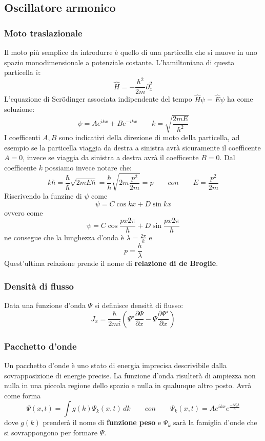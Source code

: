 \subsection{Oscillatore armonico}
\subsubsection{Moto traslazionale}
Il moto più semplice da introdurre è quello di una particella che si muove in uno spazio monodimensionale a potenziale costante. L'hamiltoniana di questa particella è:
$$\hat{H} = - \frac{\hbar^2}{2m} \partial_x^2$$
L'equazione di Scr\"odinger associata indipendente del tempo $\hat{H}\psi = \hat{E}\psi$ ha come soluzione:
$$\psi = A e^{i k x} + B e^{- i k x} \qquad k = \sqrt{\frac{2 m E}{\hbar^2}}$$
I coefficenti $A, B$ sono indicativi della direzione di moto della particella, ad esempio se la particella viaggia da destra a sinistra avrà sicuramente il coefficente $A = 0$, invece se viaggia da sinistra a destra avrà il coefficente $B = 0$.
Dal coefficente $k$ possiamo invece notare che:
$$k\hbar = \frac{\hbar}{\hbar} \sqrt{2 m E \hbar} = \frac{\hbar}{\hbar} \sqrt{2 m \frac{p^2}{2 m}} = p \qquad con \qquad E = \frac{p^2}{2m}$$
Riscrivendo la funzine di $\psi$ come
$$\psi = C \cos{kx} + D \sin{kx}$$
ovvero come
$$\psi = C \cos{\frac{p x 2 \pi}{h}} + D \sin{\frac{p x 2 \pi}{h}}$$
ne consegue che la lunghezza d'onda è $\lambda = \frac{2\pi}{k}$ e
$$p = \frac{h}{\lambda}$$
Quest'ultima relazione prende il nome di \textbf{relazione di de Broglie}.

\subsubsection{Densità di flusso}
Data una funzione d'onda $\Psi$ si definisce densità di flusso:
$$J_x = \frac{\hbar}{2mi}\left(\Psi^{\star} \frac{\partial \Psi}{\partial x} - \Psi \frac{\partial \Psi^{\star}}{\partial x}  \right)$$

\subsubsection{Pacchetto d'onde}
Un pacchetto d'onde è uno stato di energia imprecisa descrivibile dalla sovrapposizione di energie precise.
La funzione d'onda risulterà di ampiezza non nulla in una piccola regione dello spazio e nulla in qualunque altro posto.
Avrà come forma
$$\Psi(x, t) = \int g(k) \Psi_k(x, t) \, dk \qquad con \qquad \Psi_k(x, t) = A e^{ikx} e^{\frac{-i E_k t}{\hbar}}$$
dove $g(k)$ prenderà il nome di \textbf{funzione peso} e $\Psi_k$ sarà la famiglia d'onde che si sovrappongono per formare $\Psi$.

